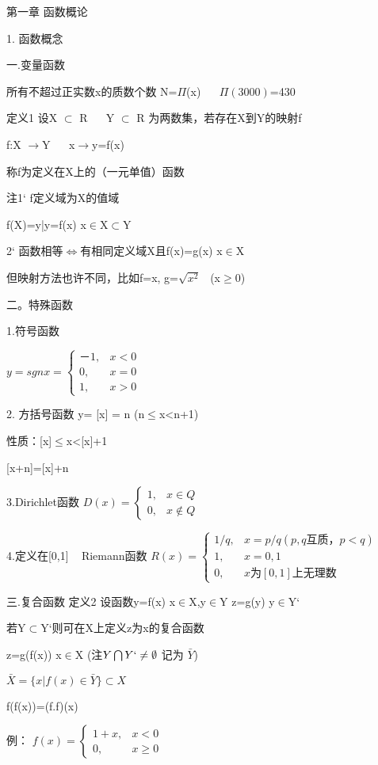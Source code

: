 \documentclass[12pt,a4paper]{article}
\begin{document}
第一章 函数概论

1. 函数概念

一.变量函数

所有不超过正实数x的质数个数 N=$\Pi$(x) ~~  $\Pi(3000)$=430

定义1 设X $\subset$ R  ~~ Y $\subset$ R 为两数集，若存在X到Y的映射f

f:X $\to$Y ~~ x$\to$y=f(x)

称f为定义在X上的（一元单值）函数

注1`  f定义域为X的值域

f(X)={y|y=f(x) x$\in$X}$\subset$Y

2` 函数相等$\iff$有相同定义域X且f(x)=g(x)  x$\in$X

但映射方法也许不同，比如f=x,  g=$\sqrt{x^2}$ ~(x$\ge$0)


二。特殊函数

1.符号函数  

$
 y=sgn x= \begin{cases} 
－1, & x < 0 \\
0, & x = 0 \\
1, &  x > 0 
\end{cases}
$

2. 方括号函数 
y= [x] = n (n$\le$x<n+1)

性质：[x]$\le$x<[x]+1

[x+n]=[x]+n

3.Dirichlet函数 
$
D(x)=\begin{cases}
1, & x\in Q \\
0, & x\notin Q
\end{cases}
$

4.定义在[0,1] ~ Riemann函数 
$
R(x)=\begin{cases}
1/q, & x=p/q (p,q互质，p<q) \\
1, & x=0,1 \\
0, & x为[0,1]上无理数
\end{cases}
$


三.复合函数
定义2 设函数y=f(x) x$\in$X,y$\in$Y  
z=g(y)  y$\in$Y`

若Y$\subset$Y`则可在X上定义z为x的复合函数

z=g(f(x))  x$\in$X (注$Y \bigcap Y` \ne  \emptyset $  记为 $\bar{Y}$) 

$\bar{X}= \{ x|f(x)\in\bar{Y} \} \subset X $

f(f(x))=(f.f)(x)

例：
$
f(x)=\begin{cases}
1+x, & x < 0 \\
0, & x \ge 0
\end{cases}
$
\end{document}
